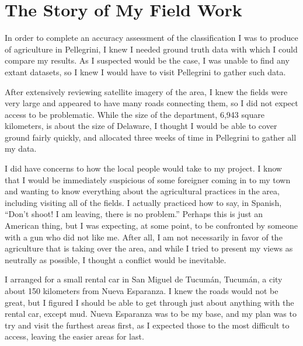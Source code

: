 \chapter{The Story of My Field Work}
\label{appendix:fieldwork}

In order to complete an accuracy assessment of the classification I was to produce of agriculture in Pellegrini, I knew I needed ground truth data with which I could compare my results. As I suspected would be the case, I was unable to find any extant datasets, so I knew I would have to visit Pellegrini to gather such data.

After extensively reviewing satellite imagery of the area, I knew the fields were very large and appeared to have many roads connecting them, so I did not expect access to be problematic. While the size of the department, 6,943 square kilometers, is about the size of Delaware, I thought I would be able to cover ground fairly quickly, and allocated three weeks of time in Pellegrini to gather all my data.

I did have concerns to how the local people would take to my project. I know that I would be immediately suspicious of some foreigner coming in to my town and wanting to know everything about the agricultural practices in the area, including visiting all of the fields. I actually practiced how to say, in Spanish, ``Don’t shoot! I am leaving, there is no problem.'' Perhaps this is just an American thing, but I was expecting, at some point, to be confronted by someone with a gun who did not like me. After all, I am not necessarily in favor of the agriculture that is taking over the area, and while I tried to present my views as neutrally as possible, I thought a conflict would be inevitable.

I arranged for a small rental car in San Miguel de Tucumán, Tucumán, a city about 150 kilometers from Nueva Esparanza. I knew the roads would not be great, but I figured I should be able to get through just about anything with the rental car, except mud. Nueva Esparanza was to be my base, and my plan was to try and visit the furthest areas first, as I expected those to the most difficult to access, leaving the easier areas for last.

